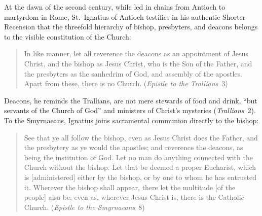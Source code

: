 At the dawn of the second century, while led in chains from Antioch to martyrdom in Rome, St.~Ignatius of Antioch testifies in his authentic Shorter Recension that the threefold hierarchy of bishop, presbyters, and deacons belongs to the visible constitution of the Church:
\begin{quotation}
In like manner, let all reverence the deacons as an appointment of Jesus Christ, and the bishop as Jesus Christ, who is the Son of the Father, and the presbyters as the sanhedrim of God, and assembly of the apostles. Apart from these, there is no Church. (\emph{Epistle to the Trallians}~3)
\end{quotation}
Deacons, he reminds the Trallians, are not mere stewards of food and drink, ``but servants of the Church of God'' and ministers of Christ's mysteries (\emph{Trallians}~2). To the Smyrnaeans, Ignatius joins sacramental communion directly to the bishop:
\begin{quotation}
See that ye all follow the bishop, even as Jesus Christ does the Father, and the presbytery as ye would the apostles; and reverence the deacons, as being the institution of God. Let no man do anything connected with the Church without the bishop. Let that be deemed a proper Eucharist, which is [administered] either by the bishop, or by one to whom he has entrusted it. Wherever the bishop shall appear, there let the multitude [of the people] also be; even as, wherever Jesus Christ is, there is the Catholic Church. (\emph{Epistle to the Smyrnaeans}~8)
\end{quotation}

